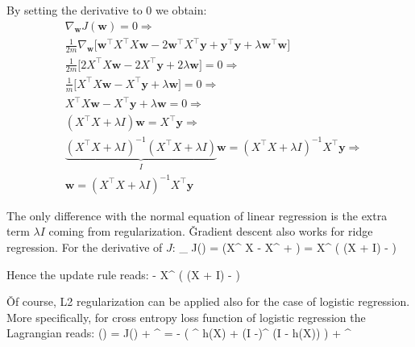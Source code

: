 By setting the derivative to 0 we obtain:
{\setlength{\jot}{10pt}
\begin{align*}
& \nabla_{\boldsymbol{w}} J(\boldsymbol{w}) = 0 \Rightarrow \\
& \frac{1}{2m} \nabla_{\boldsymbol{w}} \Big[ \boldsymbol{w}^{\intercal} X^{\intercal} X \boldsymbol{w} - 2
\boldsymbol{w}^{\intercal} X^{\intercal} \boldsymbol{y} + \boldsymbol{y}^{\intercal} \boldsymbol{y} + \lambda
\boldsymbol{w}^{\intercal} \boldsymbol{w} \Big] \\
& \frac{1}{2m} \Big[ 2 X^{\intercal} X \boldsymbol{w} - 2 X^{\intercal} \boldsymbol{y}
+ 2\lambda \boldsymbol{w} \Big] = 0 \Rightarrow \\
& \frac{1}{m} \Big[ X^{\intercal} X \boldsymbol{w} - X^{\intercal} \boldsymbol{y}
+ \lambda \boldsymbol{w} \Big] = 0 \Rightarrow \\
& X^{\intercal} X \boldsymbol{w} - X^{\intercal} \boldsymbol{y} + \lambda \boldsymbol{w} = 0 \Rightarrow \\
& (X^{\intercal} X + \lambda I) \boldsymbol{w} = X^{\intercal} \boldsymbol{y} \Rightarrow \\
& \underbrace{(X^{\intercal} X + \lambda I)^{-1} (X^{\intercal} X + \lambda I)}_{I} \boldsymbol{w}
= (X^{\intercal} X + \lambda I)^{-1} X^{\intercal} \boldsymbol{y} \Rightarrow \\
& \boldsymbol{w} = (X^{\intercal} X + \lambda I)^{-1} X^{\intercal} \boldsymbol{y}
\end{align*}}

\vspace{-10pt}

The only difference with the normal equation of linear regression is the extra term $\lambda I$ coming from
regularization. \v

Gradient descent also works for ridge regression. For the derivative of $J$:
\bse
\nabla_{} J() =  \Big(X^{\intercal} X 
- X^{\intercal}  + \lambda {} \Big) =  X^{\intercal}
\Big( (X + \lambda I)  -  \Big)
\ese

Hence the update rule reads:
\bse
{} \coloneqq {} -  X^{\intercal}
\Big( (X + \lambda I)  -  \Big)
\ese

\v

Of course, L2 regularization can be applied also for the case of logistic regression. More specifically, for cross
entropy loss function of logistic regression the Lagrangian reads:
\bse
{} () = J() +  ^{\intercal} 
= -  \Big( ^{\intercal} \cdot \ln h(X) + (I -)^{\intercal}
\cdot \ln (I - h(X)) \Big) +  ^{\intercal} 
\ese

